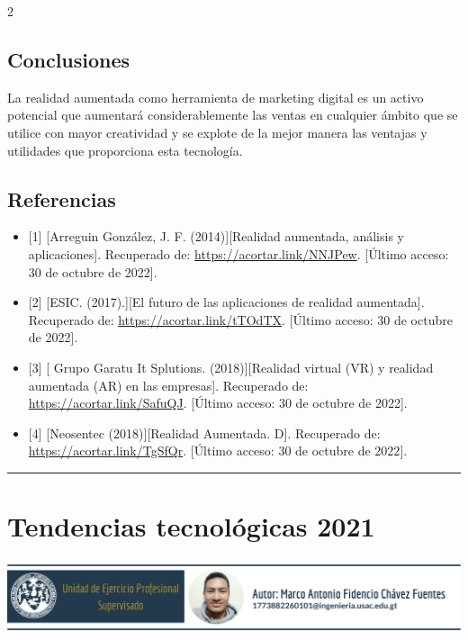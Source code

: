 \documentclass[12pt,spanish,Letterpaper,openany]{book}
\newcommand{\HRule}{\begin{center}\rule{0.5\linewidth}{0.2mm}\end{center}}
\begin{document}
\begin {multicols}{2}
\begin {flushleft}
\begin{minipage}[c]{\columnwidth}
\end{minipage}

\end {flushleft}

\hypertarget{conclusiones-4}{%
\section{Conclusiones}\label{conclusiones-4}}

La realidad aumentada como herramienta de marketing digital es un activo potencial que aumentará considerablemente las ventas en cualquier ámbito que se utilice con mayor creatividad y se explote de la mejor manera las ventajas y utilidades que proporciona esta tecnología.

\hypertarget{referencias-3}{%
\section{Referencias}\label{referencias-3}}

\begin{itemize}
\item
  {[}1{]} {[}Arreguin González, J. F. (2014){]}{[}Realidad aumentada, análisis y aplicaciones{]}. Recuperado de: \url{https://acortar.link/NNJPew}. {[}Último acceso: 30 de octubre de 2022{]}.
\item
  {[}2{]} {[}ESIC. (2017).{]}{[}El futuro de las aplicaciones de realidad aumentada{]}. Recuperado de: \url{https://acortar.link/tTOdTX}. {[}Último acceso: 30 de octubre de 2022{]}.
\item
  {[}3{]} {[} Grupo Garatu It Splutions. (2018){]}{[}Realidad virtual (VR) y realidad aumentada (AR) en las empresas{]}. Recuperado de: \url{https://acortar.link/SafuQJ}. {[}Último acceso: 30 de octubre de 2022{]}.
\item
  {[}4{]} {[}Neosentec (2018){]}{[}Realidad Aumentada. D{]}. Recuperado de: \url{https://acortar.link/TgSfQr}. {[}Último acceso: 30 de octubre de 2022{]}.
\end{itemize}

\end {multicols}
\medskip
\HRule
\medskip

\hypertarget{marco}{%
\chapter{Tendencias tecnológicas 2021}\label{marco}}

\begin{center}\includegraphics[width=1\linewidth]{images/mChavez_image1} \end{center}
\end{document}
